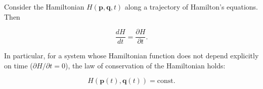 Consider the Hamiltonian $H(\mathbf{p}, \mathbf{q}, t)$ along a trajectory of Hamilton's equations. Then

$$\frac{dH}{dt} = \frac{\partial H}{\partial t}.$$

In particular, for a system whose Hamiltonian function does not depend explicitly on time ($\partial H/\partial t = 0$), the law of conservation of the Hamiltonian holds:

$$H(\mathbf{p}(t), \mathbf{q}(t)) = \text{const}.$$